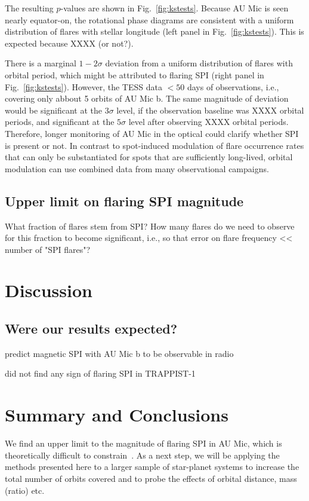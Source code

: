 \documentclass[fleqn,usenatbib,letters]{mnras}%
\begin{document}
The resulting $p$-values are shown in Fig.~\ref{fig:kstests}. Because AU Mic is seen nearly equator-on, the rotational phase diagrams are consistent with a uniform distribution of flares with stellar longitude (left panel in Fig.~\ref{fig:kstests}). This is expected because XXXX (or not?).

There is a marginal $1-2\sigma$ deviation from a uniform distribution of flares with orbital period, which might be attributed to flaring SPI (right panel in Fig.~\ref{fig:kstests}). However, the TESS data $<50$ days of observations, i.e., covering only abbout 5 orbits of AU Mic b. The same magnitude of deviation would be significant at the $3\sigma$ level, if the observation baseline was XXXX orbital periods, and significant at the $5\sigma$ level after observing XXXX orbital periods. Therefore, longer monitoring of AU Mic in the optical could clarify whether SPI is present or not. In contrast to spot-induced modulation of flare occurrence rates that can only be substantiated for spots that are sufficiently long-lived, orbital modulation can use combined data from many observational campaigns. 
\subsection{Upper limit on flaring SPI magnitude}

What fraction of flares stem from SPI? How many flares do we need to observe for this fraction to become significant, i.e., so that error on flare frequency << number of "SPI flares"?
\section{Discussion}
\subsection{Were our results expected?}
\citet{kavanagh2021} predict magnetic SPI with AU Mic b to be observable in radio 

\citet{fischer2019} did not find any sign of flaring SPI in TRAPPIST-1  
\section{Summary and Conclusions}
We find an upper limit to the magnitude of flaring SPI in AU Mic, which is theoretically difficult to constrain~\citep{strugarek2019}. As a next step, we will be applying the methods presented here to a larger sample of star-planet systems to increase the total number of orbits covered and to probe the effects of orbital distance, mass (ratio) etc.
\end{document}
